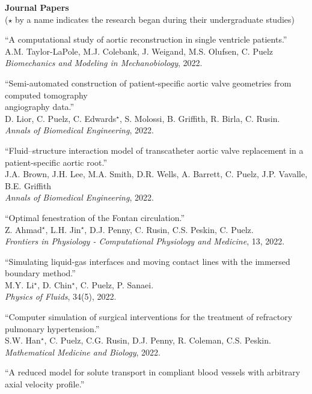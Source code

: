 \documentclass{article} %
\begin{document}
\vspace{0.5cm}
\noindent
{\bf \large Journal Papers}\\
{\footnotesize($\star$ by a name indicates the research began during their undergraduate studies)}
\begin{etaremune}
\item ``A computational study of aortic reconstruction in single ventricle patients.'' \\
A.M. Taylor-LaPole, M.J. Colebank, J. Weigand, M.S. Olufsen, C. Puelz \\
{\em Biomechanics and Modeling in Mechanobiology}, 2022.
\item ``Semi-automated construction of patient-specific aortic valve geometries from computed tomography\\ angiography data.'' \\
D. Lior, C. Puelz, C. Edwards$^\star$, S. Molossi, B. Griffith, R. Birla, C. Rusin. \\
{\em Annals of Biomedical Engineering}, 2022.
\item ``Fluid–structure interaction model of transcatheter aortic valve replacement in a patient-specific aortic root.'' \\
J.A. Brown, J.H. Lee, M.A. Smith, D.R. Wells, A. Barrett, C. Puelz, J.P. Vavalle, B.E. Griffith \\
{\em Annals of Biomedical Engineering}, 2022.
\item ``Optimal fenestration of the Fontan circulation.'' \\
Z. Ahmad$^\star$, L.H. Jin$^\star$, D.J. Penny, C. Rusin, C.S. Peskin, C. Puelz. \\
{\em Frontiers in Physiology - Computational Physiology and Medicine}, 13, 2022.
\item ``Simulating liquid-gas interfaces and moving contact lines with the immersed boundary method.'' \\
M.Y. Li$^\star$, D. Chin$^\star$, C. Puelz, P. Sanaei. \\
{\em Physics of Fluids}, 34(5), 2022.
\item ``Computer simulation of surgical interventions for the treatment of refractory pulmonary hypertension.'' \\
S.W. Han$^\star$, C. Puelz, C.G. Rusin, D.J. Penny, R. Coleman, C.S. Peskin. \\
{\em Mathematical Medicine and Biology}, 2022.
\item ``A reduced model for solute transport in compliant blood vessels with arbitrary axial velocity profile.'' \\

\end{etaremune}
\end{document}
